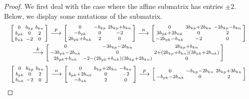 \documentclass{amsart}
\theoremstyle{definition}
\theoremstyle{remark}
\numberwithin{equation}{section}
\newcommand{\0}{{\mathbf{0}}}
\begin{document}
\begin{proof}
We first deal with the case where the affine submatrix has entries $\pm2$.
Below, we display some mutations of the submatrix.
\begin{multline*}
\begin{bsmallmatrix*}
	0 & b_{kp} & b_{kn} \\
	b_{pk} & 0 & 2 \\
	b_{nk} & -2 & 0
\end{bsmallmatrix*}
\overset{p}{\longrightarrow}
\begin{bsmallmatrix*}
	0 & -b_{kp} & 2b_{kp}+b_{kn} \\
	-b_{pk} & 0 & -2 \\
	2b_{pk}+b_{nk}& 2 & 0
\end{bsmallmatrix*}
\overset{n}{\longrightarrow}
\begin{bsmallmatrix*}
	0 & 3b_{kp}+2b_{kn} & -2b_{kp}-b_{kn} \\
	3b_{pk}+2b_{nk} & 0 & 2 \\
	-2b_{pk}-b_{nk} & -2 & 0
\end{bsmallmatrix*}\\
\overset{k}{\longrightarrow}
\begin{bsmallmatrix*}
	0 & -3b_{kp}-2b_{kn} & 2b_{kp}+b_{kn} \\
	-3b_{pk}-2b_{nk} & 0 & 2+(2b_{kp}+b_{kn})(3b_{pk}+2b_{nk}) \\
	2b_{pk}+b_{nk} & -2-(2b_{pk}+b_{nk})(3b_{kp}+2b_{kn})& 0
\end{bsmallmatrix*}
\end{multline*}
\begin{multline*}
\begin{bsmallmatrix*}
	0 & b_{kp} & b_{kn} \\
	b_{pk} & 0 & 2 \\
	b_{nk} & -2 & 0
\end{bsmallmatrix*}\overset{n}{\longrightarrow}
\begin{bsmallmatrix*}
	0 & b_{kp}+2b_{kn} & -b_{kn} \\
	b_{pk}+2b_{nk} & 0 & -2 \\
	-b_{nk} & 2 & 0
\end{bsmallmatrix*}\overset{p}{\longrightarrow}
\begin{bsmallmatrix*}
	0 & -b_{kp}-2b_{kn} & 2b_{kp}+3b_{kn} \\
	-b_{pk}-2b_{nk} & 0 & 2 \\

\end{bsmallmatrix*}
\end{multline*}
\end{proof}
\end{document}
